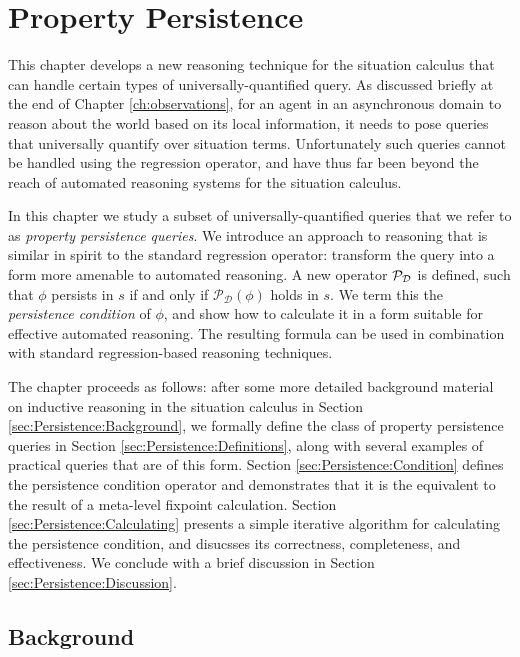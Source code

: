 

\chapter{Property Persistence}

\label{ch:persistence}

This chapter develops a new reasoning technique for the situation
calculus that can handle certain types of universally-quantified query.
As discussed briefly at the end of Chapter \ref{ch:observations},
for an agent in an asynchronous domain to reason about the world based
on its local information, it needs to pose queries that universally
quantify over situation terms. Unfortunately such queries cannot be
handled using the regression operator, and have thus far been beyond
the reach of automated reasoning systems for the situation calculus.

In this chapter we study a subset of universally-quantified queries
that we refer to as \emph{property persistence queries}. We introduce
an approach to reasoning that is similar in spirit to the standard
regression operator: transform the query into a form more amenable
to automated reasoning. A new operator $\mathcal{P}_{\mathcal{D}}$ is defined, such
that $\phi$ persists in $s$ if and only if $\mathcal{P}_{\mathcal{D}}(\phi)$
holds in $s$. We term this the \emph{persistence condition} of $\phi$,
and show how to calculate it in a form suitable for effective automated
reasoning. The resulting formula can be used in combination with standard
regression-based reasoning techniques.

The chapter proceeds as follows: after some more detailed background
material on inductive reasoning in the situation calculus in Section
\ref{sec:Persistence:Background}, we formally define the class of
property persistence queries in Section \ref{sec:Persistence:Definitions},
along with several examples of practical queries that are of this
form. Section \ref{sec:Persistence:Condition} defines the persistence
condition operator and demonstrates that it is the equivalent to the
result of a meta-level fixpoint calculation. Section \ref{sec:Persistence:Calculating}
presents a simple iterative algorithm for calculating the persistence
condition, and disucsses its correctness, completeness, and effectiveness.
We conclude with a brief discussion in Section \ref{sec:Persistence:Discussion}.


\section{Background\label{sec:Persistence:Background}}


